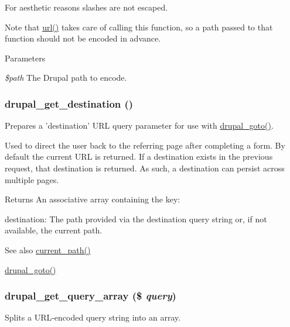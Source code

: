 For aesthetic reasons slashes are not escaped.

Note that \hyperlink{common_8inc_a43b2a0594431556db49df980801d8807}{url()} takes care of calling this function, so a path passed to that function should not be encoded in advance.


\begin{DoxyParams}{Parameters}
\item[{\em \$path}]The Drupal path to encode. \end{DoxyParams}
\hypertarget{group__http__handling_ga0c95c16e75ac4df882686daccc1f8ac5}{
\subsubsection[{drupal\_\-get\_\-destination}]{\setlength{\rightskip}{0pt plus 5cm}drupal\_\-get\_\-destination ()}}
\label{group__http__handling_ga0c95c16e75ac4df882686daccc1f8ac5}
Prepares a 'destination' URL query parameter for use with \hyperlink{group__http__handling_ga5b68d7a934713d1d623b2b32a732235d}{drupal\_\-goto()}.

Used to direct the user back to the referring page after completing a form. By default the current URL is returned. If a destination exists in the previous request, that destination is returned. As such, a destination can persist across multiple pages.

\begin{DoxyReturn}{Returns}
An associative array containing the key:
\begin{DoxyItemize}
\item destination: The path provided via the destination query string or, if not available, the current path.
\end{DoxyItemize}
\end{DoxyReturn}
\begin{DoxySeeAlso}{See also}
\hyperlink{path_8inc_a97aaa03027cbf6f0ffdd9a4bf5c9a31c}{current\_\-path()} 

\hyperlink{group__http__handling_ga5b68d7a934713d1d623b2b32a732235d}{drupal\_\-goto()} 
\end{DoxySeeAlso}
\hypertarget{group__http__handling_ga0ef58c019ee4bf4e1166e876f9721c12}{
\subsubsection[{drupal\_\-get\_\-query\_\-array}]{\setlength{\rightskip}{0pt plus 5cm}drupal\_\-get\_\-query\_\-array (\$ {\em query})}}
\label{group__http__handling_ga0ef58c019ee4bf4e1166e876f9721c12}
Splits a URL-\/encoded query string into an array.


